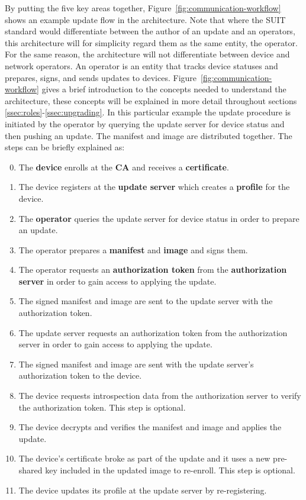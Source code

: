 \documentclass[0-thesis.tex]{subfiles}
\begin{document}
By putting the five key areas together, Figure~\ref{fig:communication-workflow} shows an
example update flow in the architecture. Note that where the SUIT standard would
differentiate between the author of an update and an operators, this architecture will for
simplicity regard them as the same entity, the operator. For the same reason, the
architecture will not differentiate between device and network operators. An operator is
an entity that tracks device statuses and prepares, signs, and sends updates to devices.
Figure~\ref{fig:communication-workflow} gives a brief introduction to the concepts needed
to understand the architecture, these concepts will be explained in more detail throughout
sections \ref{ssec:roles}-\ref{ssec:upgrading}. In this particular example the update
procedure is initiated by the operator by querying the update server for device status and
then pushing an update. The manifest and image are distributed together. The steps can be
briefly explained as:

\begin{enumerate}
    \setcounter{enumi}{-1}
    \item The \textbf{device} enrolls at the \textbf{CA} and receives a
            \textbf{certificate}.
    \item The device registers at the \textbf{update server} which creates a \textbf{profile}
            for the device.
    \item The \textbf{operator} queries the update server for device status in order to
            prepare an update.
    \item The operator prepares a \textbf{manifest} and \textbf{image} and signs them.
    \item The operator requests an \textbf{authorization token} from the
            \textbf{authorization server} in order to gain access to applying the update.
    \item The signed manifest and image are sent to the update server with the
            authorization token.
    \item The update server requests an authorization token from the authorization server
            in order to gain access to applying the update.
    \item The signed manifest and image are sent with the update server's authorization
            token to the device.
    \item The device requests introspection data from the authorization server to verify
            the authorization token. This step is optional.
    \item The device decrypts and verifies the manifest and image and applies the update.
    \item The device's certificate broke as part of the update and it uses a new
            pre-shared key included in the updated image to re-enroll. This step is
            optional.
    \item The device updates its profile at the update server by re-registering.
\end{enumerate}
\end{document}
